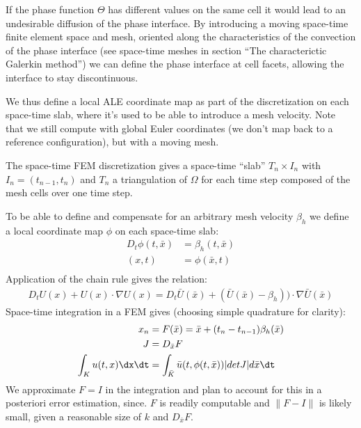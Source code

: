 If the phase function $\Theta$ has different values on
the same cell it would lead to an undesirable
diffusion of the phase interface. By introducing a
moving space-time finite element space and mesh,
oriented along the characteristics of the convection
of the phase
interface \citep{ErikssonEstepHansboEtAl1996} (see
space-time meshes in section ``The characterictic
Galerkin method'') we can define the phase interface
at cell facets, allowing the interface to stay
discontinuous.

We thus define a local ALE coordinate
map \citep{ErikssonEstepHansboEtAl1996} as part of the
discretization on each space-time slab, where it's
used to be able to introduce a mesh velocity. Note
that we still compute with global Euler coordinates
(we don't map back to a reference configuration), but
with a moving mesh.

The space-time FEM discretization gives a space-time
``slab'' $T_n \times I_n$ with $I_n = (t_{n-1}, t_n)$
and $T_n$ a triangulation of $\Omega$ for each time
step composed of the mesh cells over one time step.

To be able to define and compensate for an arbitrary
mesh velocity $\beta_h$ we define a local coordinate
map $\phi$ on each space-time slab:
\begin{equation}
\begin{split}\label{eq:ALEmap}
D_t \phi(t, \bar{x}) &= \beta_h(t, \bar{x})\\
(x, t) &= \phi(\bar{x}, t)\\
\end{split}
\end{equation}
Application of the chain rule gives the relation:
\begin{equation}
\begin{split}\label{eq:ALE2}
D_t U(x) + U(x) \cdot \nabla U(x) = D_t \bar{U}(\bar{x}) +
(\bar{U}(\bar{x}) - \beta_h)) \cdot \nabla \bar{U}(\bar{x})
\end{split}
\end{equation}
Space-time integration in a FEM gives (choosing simple
quadrature for clarity):
\begin{equation}
\begin{split}\label{eq:ALEFEM}
x_n &= F(\bar{x}) = \bar{x} + (t_n - t_{n - 1})\beta_h(\bar{x})\\
J &= D_{\bar{x}} F\\
\int_{K} u(t, x) \dx\dt &= \int_{\bar{K}} \bar{u}(t, \phi(t, \bar{x})) |det J| d\bar{x}\dt
\end{split}
\end{equation}
We approximate $F = I$ in the integration and plan to
account for this in a posteriori error estimation,
since. $F$ is readily computable and $\|F - I\|$ is
likely small, given a reasonable size of $k$ and
$D_{\bar{x}} F$.

